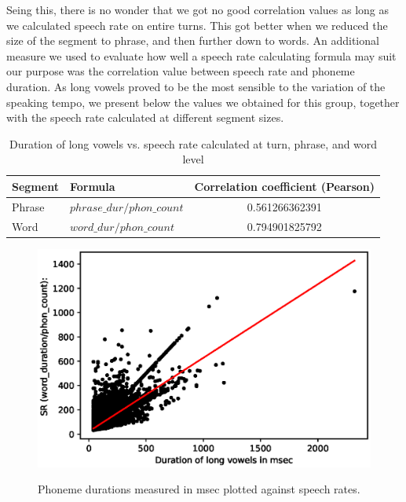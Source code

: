\documentclass[11pt,a4paper]{scrbook}
\begin{document}
Seing this, there is no wonder that we got no good correlation values as long as we calculated speech rate on entire turns. This got better when we reduced the size of the segment to phrase, and then further down to words. 
An additional measure we used to evaluate how well a speech rate calculating formula may suit our purpose was the correlation value between speech rate and phoneme duration. As long vowels proved to be the most sensible to the variation of the speaking tempo, we present below the values we obtained for this group, together with the speech rate calculated at different segment sizes.

\begin{table}[htbp]
\caption {Duration of long vowels vs. speech rate calculated at turn, phrase, and word level} 
\vspace{10mm}
\begin{tabular}{|l|l|c|}
\hline
Segment	 & Formula & Correlation coefficient (Pearson)\\
\hline
\hline

Phrase  & $phrase\_dur / phon\_count$ & 0.561266362391\\
	\hline
Word  & $word\_dur / phon\_count$ &  0.794901825792\\
	\hline
\end{tabular}
\end{table}

\begin{figure}[htbp]
	\centering
	\includegraphics[width=\textwidth]{../Graphen/SR4.eps}
	\label{fig:}
\caption[Speech rate vs long vowel duration]{Phoneme durations measured in msec plotted against speech rates.}
\label{fig:wsr}
\end{figure}
\end{document}
